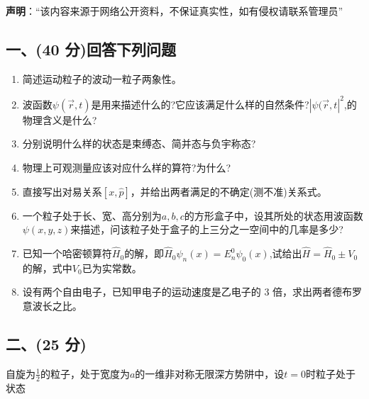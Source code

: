 
\textbf{声明}：“该内容来源于网络公开资料，不保证真实性，如有侵权请联系管理员”

\subsection{一、(40 分)回答下列问题}
\begin{enumerate}
\item 简述运动粒子的波动一粒子两象性。
\item 波函数$\psi(\vec{r},t)$是用来描述什么的?它应该满足什么样的自然条件?$|\psi(\vec{r},t|^2$,的物理含义是什么?
\item 分别说明什么样的状态是束缚态、简并态与负宇称态?
\item 物理上可观测量应该对应什么样的算符?为什么?
\item 直接写出对易关系$[x,\hat{p}]$，并给出两者满足的不确定(测不准)关系式。
\item 一个粒子处于长、宽、高分别为$a,b,c$的方形盒子中，设其所处的状态用波函数$\psi(x,y,z)$来描述，问该粒子处于盒子的上三分之一空间中的几率是多少?
\item 已知一个哈密顿算符$\hat{H}_0$的解，即$\hat{H}_0\psi_n(x)=E^0_n\psi_0(x)$,试给出$\hat{H}=\hat{H}_0\pm V_0$的解，式中$V_0$已为实常数。
\item 设有两个自由电子，已知甲电子的运动速度是乙电子的 3 倍，求出两者德布罗意波长之比。
\end{enumerate}
\subsection{二、(25 分)}
自旋为$\frac{1}{2}$的粒子，处于宽度为$a$的一维非对称无限深方势阱中，设$t=0$时粒子处于状态